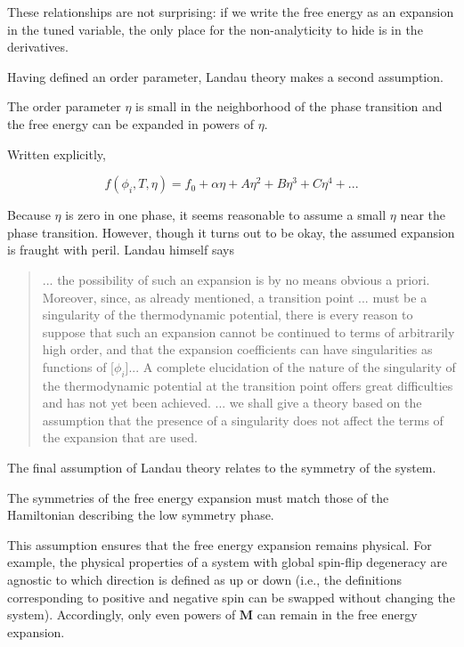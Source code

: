These relationships are not surprising: if we write the free energy as an expansion in the tuned variable, the only place for the non-analyticity to hide is in the derivatives.

Having defined an order parameter, Landau theory makes a second assumption.

\begin{assumption}
The order parameter $\eta$ is small in the neighborhood of the phase transition and the free energy can be expanded in powers of $\eta$.
\end{assumption}

Written explicitly,

\begin{equation}
f(\phi_{i},T,\eta) = f_{0} + \alpha \eta + A \eta^{2} + B \eta^{3} + C \eta^{4} + ...
\end{equation}

Because $\eta$ is zero in one phase, it seems reasonable to assume a small $\eta$ near the phase transition. However, though it turns out to be okay, the assumed expansion is fraught with peril. Landau himself says \cite{Landau1969}

\begin{quote}
... the possibility of such an expansion is by no means obvious a priori. Moreover, since, as already mentioned, a transition point ... must be a singularity of the thermodynamic potential, there is every reason to suppose that such an expansion cannot be continued to terms of arbitrarily high order, and that the expansion coefficients can have singularities as functions of [$\phi_{i}$]... A complete elucidation of the nature of the singularity of the thermodynamic potential at the transition point offers great difficulties and has not yet been achieved. ... we shall give a theory based on the assumption that the presence of a singularity does not affect the terms of the expansion that are used.
\end{quote}

The final assumption of Landau theory relates to the symmetry of the system.

\begin{assumption}
The symmetries of the free energy expansion must match those of the Hamiltonian describing the low symmetry phase.
\end{assumption}

This assumption ensures that the free energy expansion remains physical. For example, the physical properties of a system with global spin-flip degeneracy are agnostic to which direction is defined as up or down (i.e., the definitions corresponding to positive and negative spin can be swapped without changing the system). Accordingly, only even powers of $\mathbf{M}$ can remain in the free energy expansion.


